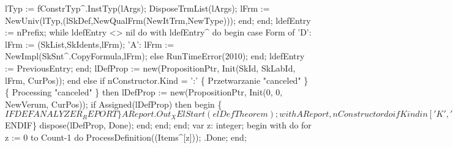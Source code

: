                   lTyp := fConstrTyp^.InstTyp(lArgs);
                  DisposeTrmList(lArgs);
                  lFrm := NewUniv(lTyp,(lSkDef,NewQualFrm(NewItTrm,NewType)));
               end;
            end;
            ldefEntry := nPrefix;
            while ldefEntry <> nil do with ldefEntry^ do
            begin
               case Form of
                  'D': lFrm := (SkList,SkIdents,lFrm);
                  'A': lFrm := NewImpl(SkSnt^.CopyFormula,lFrm);
               else RunTimeError(2010);
               end;
               ldefEntry := PreviousEntry;
            end;
            lDefProp := new(PropositionPtr, Init(SkId, SkLabId, lFrm, CurPos));
         end
         else if nConstructor.Kind = ':'
                    \{ Przetwarzanie "canceled" \} \{ Processing "canceled" \}
         then lDefProp := new(PropositionPtr, Init(0, 0, NewVerum, CurPos));
         if Assigned(lDefProp) then
         begin
            \{$IFDEF ANALYZER_REPORT\}
            AReport.Out_XElStart(elDefTheorem);
            with AReport, nConstructor do
                             if Kind in [ 'K','M','R','V'] then
                             begin
                                Out_XAttr(atConstrKind, Kind);
                                Out_XIntAttr(atConstrNr, Transf(ConstructorKind(Kind), Nr));
                             end;
            AReport.Out_XAttrEnd;
            AReport.Out_Proposition(lDefProp);
            AReport.Out_XElEnd(elDefTheorem);
            \{$ENDIF\}
            dispose(lDefProp, Done);
         end;
      end;
   end;
var
   z: integer;
begin
   with  do
      for z := 0 to Count-1 do
         ProcessDefinition((Items^[z]));
   .Done;
end;
\eatline
